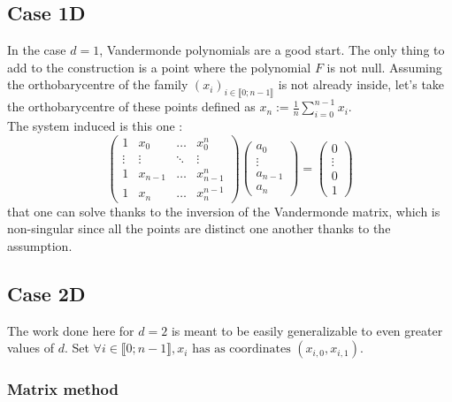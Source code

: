 \subsection{Case 1D}
In the case $d=1$, Vandermonde polynomials are a good start. The only thing to add to the construction is a point where the polynomial $F$ is not null. Assuming the orthobarycentre of the family $(x_i)_{i\in \llbracket0;n-1\rrbracket }$ is not already inside, let's take the orthobarycentre of these points defined as $x_n:=\frac{1}{n}\sum_{i=0}^{n-1} x_i$.\\
The system induced is this one :
\begin{equation*}
    \begin{pmatrix}
        1 & x_0 & \dots & x_{0}^{n} \\
        \vdots & \vdots & \ddots & \vdots\\
        1 & x_{n-1} & \dots & x_{n-1}^{n} \\
        1 & x_n & \dots & x_n^{n-1} 
    \end{pmatrix}
    \begin{pmatrix}
        a_0\\
        \vdots\\
        a_{n-1}\\
        a_{n}
    \end{pmatrix}
    =
    \begin{pmatrix}
        0\\
        \vdots\\
        0\\
        1
    \end{pmatrix}
\end{equation*}
that one can solve thanks to the inversion of the Vandermonde matrix, which is non-singular since all the points are distinct one another thanks to the assumption.


\subsection{Case 2D}
The work done here for $d=2$ is meant to be easily generalizable to even greater values of $d$.
Set $\forall i \in \llbracket0;n-1\rrbracket, x_i \text{ has as coordinates }(x_{i,0},x_{i,1})$.

\subsubsection{Matrix method}
